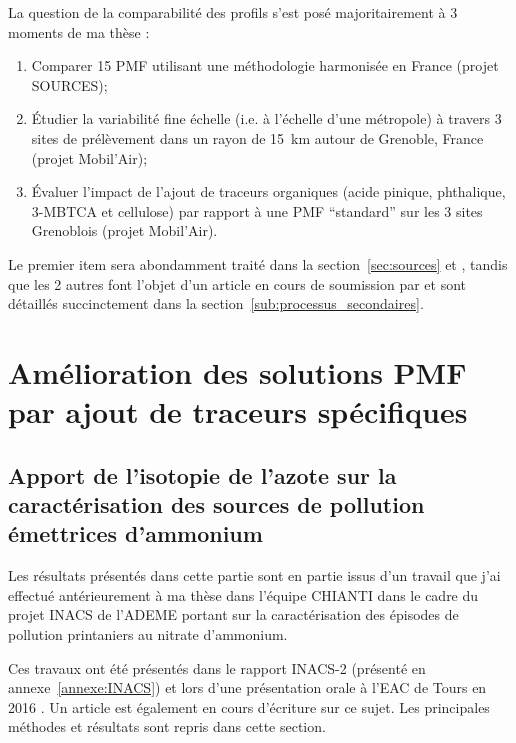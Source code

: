 La question de la comparabilité des profils s'est posé majoritairement à 3 moments de ma
thèse :
\begin{enumerate}
    \item Comparer 15 PMF utilisant une méthodologie harmonisée en France (projet SOURCES);
    \item Étudier la variabilité fine échelle (i.e. à l'échelle d'une métropole) à travers
        3 sites de prélèvement dans un rayon de \SI{15}{\kilo\m} autour de Grenoble, France
        (projet Mobil'Air);
    \item Évaluer l'impact de l'ajout de traceurs organiques (acide pinique, phthalique,
        3-MBTCA et cellulose) par rapport à une PMF ``standard'' sur les 3 sites
        Grenoblois (projet Mobil'Air).
\end{enumerate}

Le premier item sera abondamment traité dans la section~\ref{sec:sources} et
\textcite{weberComparison2019}, tandis que les 2 autres font l'objet d'un article en
cours de soumission par \textcite{borlazaFinescaleinprep.} et sont détaillés succinctement
dans la section~\ref{sub:processus_secondaires}.

\section{Amélioration des solutions PMF par ajout de traceurs spécifiques}%
\label{sec:amélioration_des_solutions_pmf}

\subsection{Apport de l'isotopie de l'azote sur la caractérisation des sources de pollution émettrices d’ammonium}%
\label{sub:isotopie}

Les résultats présentés dans cette partie sont en partie issus d'un travail que j'ai
effectué antérieurement à ma
thèse dans l'équipe CHIANTI dans le cadre du projet INACS de l'ADEME portant sur
la caractérisation des épisodes de pollution printaniers au nitrate d'ammonium.

\begin{tcolorbox}[colback=red!5!white,colframe=Melon,title=Note]
    Ces travaux ont été présentés dans le rapport INACS-2 (présenté en
    annexe~\ref{annexe:INACS}) et lors d'une présentation orale à l'EAC de Tours en 2016
    \autocite{weberNitrogen5}.
    Un article est également en cours d'écriture sur ce sujet.  Les principales méthodes
    et résultats sont repris dans cette section.
\end{tcolorbox}

